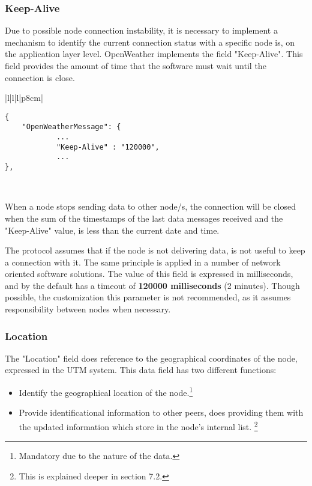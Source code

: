 \subsubsection{Keep-Alive}

Due to possible node connection instability, it is necessary to implement a mechanism to identify the current connection status with a specific node is, on the application layer level. OpenWeather implements the field "Keep-Alive". This field provides the amount of time that the software must wait until the connection is close.

\begin{table}[H]
\centering
\begin{tabular}{|l|l|l|p{8cm}|}
\hline
\begin{minipage}[t]{\linewidth}
	\begin{verbatim}
{
    "OpenWeatherMessage": {
            ...
            "Keep-Alive" : "120000",
            ...
},
      \end{verbatim}
\end{minipage} \\
\hline
\end{tabular}
\caption{Keep-Alive field in a data messages of OpenWeather protocol.}
\end{table}

When a node stops sending data to other node/s, the connection will be closed when the sum of the timestamps of the last data messages received and the "Keep-Alive" value, is less than the current date and time.

The protocol assumes that if the node is not delivering data, is not useful to keep a connection with it. The same principle is applied in a number of network oriented software solutions. The value of this field is expressed in milliseconds, and by the default has a timeout of  \textbf{120000 milliseconds} (2 minutes). Though possible, the customization this parameter is not recommended, as it assumes responsibility between nodes when necessary.

\subsubsection{Location}

The "Location" field does reference to the geographical coordinates of the node, expressed in the \gls{UTM} system. This data field has two different functions:

\begin{itemize}
\item Identify the geographical location of the node.\footnote{Mandatory due to the nature of the data.}
\item Provide identificational information to other peers, does providing them with the updated information which store in the node's internal list. \footnote{This is explained deeper in section 7.2.}
\end{itemize}

